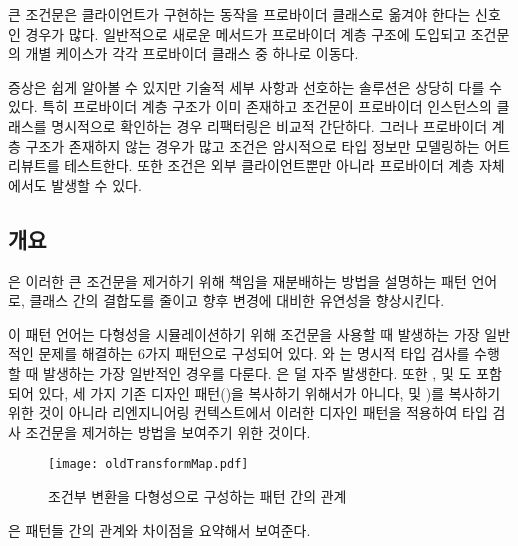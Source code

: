 \documentclass[a4paper,10pt,twoside]{book}
\begin{document}
큰 조건문은 클라이언트가 구현하는 동작을 프로바이더 클래스로 옮겨야 한다는 신호인 경우가 많다. 일반적으로 새로운 메서드가 프로바이더 계층 구조에 도입되고 조건문의 개별 케이스가 각각 프로바이더 클래스 중 하나로 이동다.

증상은 쉽게 알아볼 수 있지만 기술적 세부 사항과 선호하는 솔루션은 상당히 다를 수 있다. 특히 프로바이더 계층 구조가 이미 존재하고 조건문이 프로바이더 인스턴스의 클래스를 명시적으로 확인하는 경우 리팩터링은 비교적 간단하다. 그러나 프로바이더 계층 구조가 존재하지 않는 경우가 많고 조건은 암시적으로 타입 정보만 모델링하는 어트리뷰트를 테스트한다. 또한 조건은 외부 클라이언트뿐만 아니라 프로바이더 계층 자체에서도 발생할 수 있다. 

\subsection*{개요}

은 이러한 큰 조건문을 제거하기 위해 책임을 재분배하는 방법을 설명하는 패턴 언어로, 클래스 간의 결합도를 줄이고 향후 변경에 대비한 유연성을 향상시킨다. 

이 패턴 언어는 다형성을 시뮬레이션하기 위해 조건문을 사용할 때 발생하는 가장 일반적인 문제를 해결하는 6가지 패턴으로 구성되어 있다. 와 는 명시적 타입 검사를 수행할 때 발생하는 가장 일반적인 경우를 다룬다. 은 덜 자주 발생한다. 또한 ,  및 도 포함되어 있다, 세 가지 기존 디자인 패턴()을 복사하기 위해서가 아니다,  및 )를 복사하기 위한 것이 아니라 리엔지니어링 컨텍스트에서 이러한 디자인 패턴을 적용하여 타입 검사 조건문을 제거하는 방법을 보여주기 위한 것이다.

\begin{figure}
\begin{center}
\texttt{[image: oldTransformMap.pdf]}
\caption{조건부 변환을 다형성으로 구성하는 패턴 간의 관계}
\end{center}
\end{figure}

은 패턴들 간의 관계와 차이점을 요약해서 보여준다.
\end{document}
